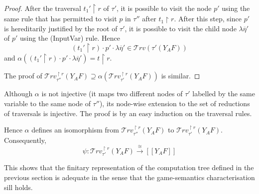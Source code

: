 \documentclass{article}
\newcommand{\sem}[1]{{[\![ #1 ]\!]}}
\newcommand{\travset}{\mathcal{T}rv}
\begin{document}
\begin{proof}
After the traversal $t_1'\upharpoonright r$ of $\tau'$, it is possible to  visit the node $p'$ using the same rule that has permitted to visit $p$ in $\tau''$ after $t_1\upharpoonright r$. After this step, since $p'$ is hereditarily justified by the root of $\tau'$, it is possible to visit the child node $\lambda \overline{\eta}'$ of $p'$ using the (InputVar) rule. Hence 
$$(t_1'\upharpoonright r) \cdot p' \cdot \lambda \overline{\eta}' \in \travset(\tau'(Y_A F)) $$
and $\alpha((t_1'\upharpoonright r) \cdot p' \cdot \lambda \overline{\eta}') = t\upharpoonright r$.

The proof of $\travset^{\upharpoonright r}_{\tau''}(Y_A F) \supseteq \alpha(\travset^{\upharpoonright r}_{\tau'}(Y_A F))$ is similar.
 \end{proof}

Although $\alpha$ is not injective (it maps two different nodes of $\tau'$ labelled by the same variable to the same node of $\tau''$), its node-wise extension to the set of reductions of traversals is injective.
The proof is by an easy induction on the traversal rules.



Hence $\alpha$ defines an isomorphism from $\travset^{\upharpoonright r}_{\tau''}(Y_A F)$ 
to $\travset^{\upharpoonright r}_{\tau'}(Y_A F)$.
Consequently,
$$ \psi : \travset^{\upharpoonright r}_{\tau'}( Y_A F) \stackrel{\cong}{\longrightarrow} \sem{Y_A F}$$

This shows that the finitary representation of the computation tree defined in the previous section is adequate in the sense that the game-semantics characterisation sill holds.
\end{document}
